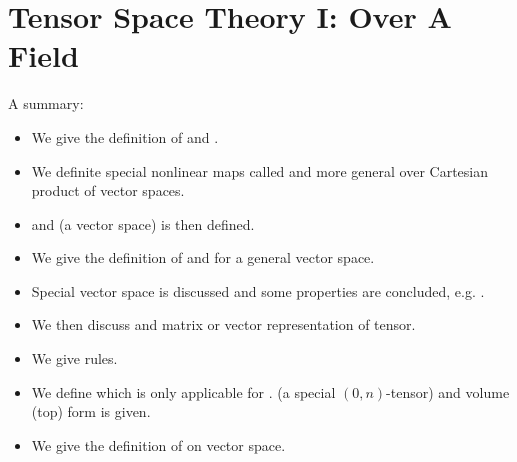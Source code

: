 \documentclass{article}
\begin{document}
\section{Tensor Space Theory I: Over A Field}\label{sec:tensorI}
A summary:
\begin{itemize}[$\blacktriangleright$]
\item We give the definition of  and .
\item We definite special nonlinear maps called  and more general  over Cartesian product of vector spaces.
\item {} and  (a vector space) is then defined.
\item We give the definition of  and  for a general vector space.
\item Special  vector space is discussed and some properties are concluded, e.g. .
\item We then discuss  and matrix or vector representation of tensor.
\item We give  rules.
\item We define  which is only applicable for .  (a special $(0, n)$-tensor) and volume (top) form is given.
\item We give the definition of  on vector space. 
\end{itemize}
\end{document}
